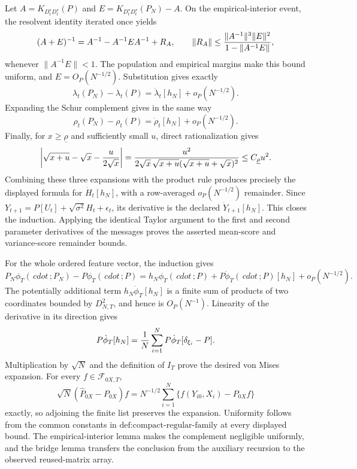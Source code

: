 Let \(A=K_{D_t^{\star}D_t^{\star}}(P)\) and \(E=K_{D_t^{\star}D_t^{\star}}(P_N)-A\).  On the empirical-interior event, the resolvent identity iterated once yields
\[
 (A+E)^{-1}=A^{-1}-A^{-1}EA^{-1}+R_A,
 \qquad \|R_A\|\le {\|A^{-1}\|^3\|E\|^2\over1-\|A^{-1}E\|},
\]
whenever \(\|A^{-1}E\|<1\).  The population and empirical margins make this bound uniform, and \(E=O_P(N^{-1/2})\).  Substitution gives exactly
\[
 \lambda_t(P_N)-\lambda_t(P)=\dot\lambda_t[h_N]+o_P(N^{-1/2}).
\]
Expanding the Schur complement gives in the same way
\[
 \rho_t(P_N)-\rho_t(P)=\dot\rho_t[h_N]+o_P(N^{-1/2}).
\]
Finally, for \(x\ge\underline\rho\) and sufficiently small \(u\), direct rationalization gives
\[
 \left|\sqrt{x+u}-\sqrt x-{u\over2\sqrt x}\right|
 ={u^2\over2\sqrt x\,\sqrt{x+u}(\sqrt{x+u}+\sqrt x)^2}
 \le C_{\underline\rho}u^2.
\]
Combining these three expansions with the product rule produces precisely the displayed formula for \(\dot H_t[h_N]\), with a row-averaged \(o_P(N^{-1/2})\) remainder.  Since \(Y_{t+1}=P[U_t]+\sqrt{\sigma^2}H_t+\epsilon_t\), its derivative is the declared \(\dot Y_{t+1}[h_N]\).  This closes the induction.  Applying the identical Taylor argument to the first and second parameter derivatives of the messages proves the asserted mean-score and variance-score remainder bounds.

For the whole ordered feature vector, the induction gives
\[
 P_N\phi_T(\,cdot\,;P_N)-P\phi_T(\,cdot\,;P)
 =h_N\phi_T(\,cdot\,;P)+P\dot\phi_T(\,cdot\,;P)[h_N]+o_P(N^{-1/2}).
\]
The potentially additional term \(h_N\dot\phi_T[h_N]\) is a finite sum of products of two coordinates bounded by \(D_{N,T}^2\), and hence is \(O_P(N^{-1})\).  Linearity of the derivative in its direction gives
\[
 P\dot\phi_T[h_N]
 ={1\over N}\sum_{i=1}^NP\dot\phi_T[\delta_{\xi_i}-P].
\]
Multiplication by \(\sqrt N\) and the definition of \(I_T\) prove the desired von Mises expansion.  For every \(f\in\mathcal F_{0X,T}\),
\[
 \sqrt N(\widehat P_{0X}-P_{0X})f
 =N^{-1/2}\sum_{i=1}^N\{f(Y_{i0},X_i)-P_{0X}f\}
\]
exactly, so adjoining the finite list preserves the expansion.  Uniformity follows from the common constants in \(\text{def:compact-regular-family}\) at every displayed bound.  The empirical-interior lemma makes the complement negligible uniformly, and the bridge lemma transfers the conclusion from the auxiliary recursion to the observed reused-matrix array.

